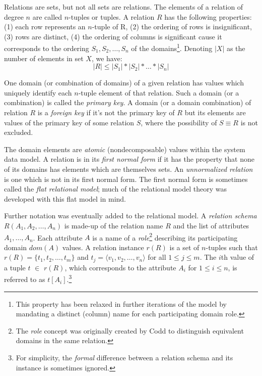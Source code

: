\documentclass [a4paper, 12pt, twocolumn]{article}
\newcommand{\<}    {\langle}            %
\renewcommand{\>}  {\rangle}            %
\begin{document}
Relations are sets, but not all sets are relations. The elements of a
relation of degree $n$ are called $n$-tuples or tuples. A relation $R$ has
the following properties: (1) each row represents an $n$-tuple of R, (2) the
ordering of rows is insignificant, (3) rows are distinct, (4) the ordering of
columns is significant cause it corresponds to the ordering
$S_1, S_2, \ldots, S_n$ of the domains\footnote{This property has been
relaxed in further iterations of the model by mandating a distinct (column)
name for each participating domain role.}. Denoting $|X|$ as the number of
elements in set $X$, we have:
\begin{equation*}
  |R| \le |S_1| * |S_2| * \ldots * |S_n|
\end{equation*}

One domain (or combination of domains) of a given relation has values which
uniquely identify each $n$-tuple element of that relation. Such a domain (or
a combination) is called the \emph{primary key}. A domain (or a domain
combination) of relation $R$ is a \emph{foreign key} if it's not the primary
key of $R$ but its elements are values of the primary key of some relation
$S$, where the possibility of $S \equiv R$ is not excluded.

The domain elements are \emph{atomic} (nondecomposable) values within the
system data model. A relation is in its \emph{first normal form} if it has
the property that none of its domains has elements which are themselves sets.
An \emph{unnormalized relation} is one which is not in its first normal form.
The first normal form is sometimes called the \emph{flat relational model};
much of the relational model theory was developed with this flat model in
mind.

Further notation was eventually added to the relational model. A
\emph{relation schema} $R(A_1, A_2, \ldots, A_n)$ is made-up of the relation
name $R$ and the list of attributes $A_1, \ldots, A_n$. Each attribute $A$ is
a name of a \emph{role}\footnote{The \emph{role} concept was originally
created by Codd to distinguish equivalent domains in the same relation.}
describing its participating domain $dom(A)$ values. A relation instance
$r(R)$ is a set of $n$-tuples such that $r(R) = \{t_1, t_2, \ldots, t_m\}$
and $t_j = \<v_1, v_2, \ldots, v_n\>$ for all $1 \le j \le m$. The $i$th
value of a tuple $t$ $\in$ $r(R)$, which corresponds to the attribute $A_i$
for $1 \le i \le n$, is referred to as $t[A_i]$.\footnote{For simplicity, the
\emph{formal} difference between a relation schema and its instance is
sometimes ignored.}
\end{document}
